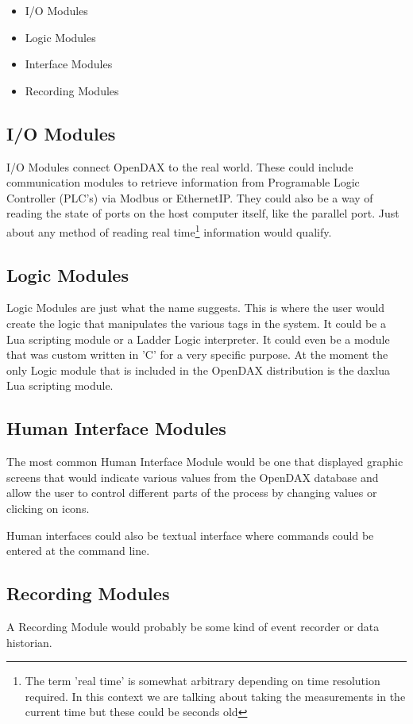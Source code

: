 \begin{itemize}
\item I/O Modules
\item Logic Modules
\item Interface Modules
\item Recording Modules
\end{itemize}

\subsection*{I/O Modules}
I/O Modules connect OpenDAX to the real world. These could include communication modules to retrieve information from Programable Logic Controller (PLC's) via Modbus or EthernetIP.  They could also be a way of reading the state of ports on the host computer itself, like the parallel port.  Just about any method of reading real time\footnote{The term 'real time' is somewhat arbitrary depending on time resolution required.  In this context we are talking about taking the measurements in the current time but these could be seconds old} information would qualify.

\subsection*{Logic Modules}
Logic Modules are just what the name suggests.  This is where the user would create the logic that manipulates the various tags in the system.  It could be a Lua scripting module or a Ladder Logic interpreter.  It could even be a module that was custom written in 'C' for a very specific purpose.  At the moment the only Logic module that is included in the OpenDAX distribution is the daxlua Lua scripting module.

\subsection*{Human Interface Modules}
The most common Human Interface Module would be one that displayed graphic screens that would indicate various values from the OpenDAX database and allow the user to control different parts of the process by changing values or clicking on icons.

Human interfaces could also be textual interface where commands could be entered at the command line.

\subsection*{Recording Modules}
A Recording Module would probably be some kind of event recorder or data historian.


